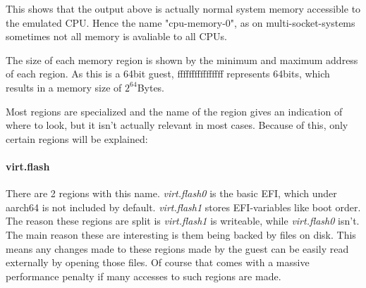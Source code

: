 This shows that the output above is actually normal system memory accessible to the emulated CPU.
Hence the name "cpu-memory-0", as on multi-socket-systems sometimes not all memory is avaliable to all CPUs.

The size of each memory region is shown by the minimum and maximum address of each region.
As this is a 64bit guest, ffffffffffffffff represents 64bits, which results in a memory size of $2^{64}$Bytes.

Most regions are specialized and the name of the region gives an indication of where to look,
but it isn't actually relevant in most cases.
Because of this, only certain regions will be explained:

\paragraph{virt.flash}
There are 2 regions with this name. \emph{virt.flash0} is the basic EFI, which under aarch64 is not included by default.
\emph{virt.flash1} stores EFI-variables like boot order.
The reason these regions are split is \emph{virt.flash1} is writeable, while \emph{virt.flash0} isn't.
The main reason these are interesting is them being backed by files on disk.
This means any changes made to these regions made by the guest can be easily read externally by opening those files.
Of course that comes with a massive performance penalty if many accesses to such regions are made.